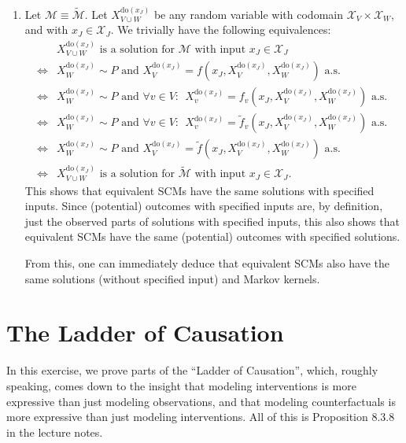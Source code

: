 \begin{gradedsolution}
\begin{enumerate}
    \item Let $\mathcal{M} \equiv \widetilde{\mathcal{M}}$.
      Let $X_{V\cup W}^{\text{do}(x_J)}$ be any random variable with codomain $\mathcal{X}_V \times \mathcal{X}_W$, and with $x_J \in \mathcal{X}_J$.
      We trivially have the following equivalences:
      \begin{align*}
      &	X_{V \cup W}^{\text{do}(x_J)} \text{ is a solution for } \mathcal{M} \text{ with input } x_J \in \mathcal{X}_J \\
      \Longleftrightarrow & X_W^{\text{do}(x_J)} \sim P \text{ and } X_V^{\text{do}(x_J)} = f(x_J, X_V^{\text{do}(x_J)}, X_W^{\text{do}(x_J)}) \text{ a.s. } \\
      \Longleftrightarrow & X_W^{\text{do}(x_J)} \sim P \text{ and } \forall v \in V: \ \ X_v^{\text{do}(x_J)} = f_v(x_J, X_V^{\text{do}(x_J)}, X_W^{\text{do}(x_J)}) \text{ a.s. } \\
      \Longleftrightarrow & X_W^{\text{do}(x_J)} \sim P \text{ and } \forall v \in V: \ \ X_v^{\text{do}(x_J)} = \widetilde{f}_v(x_J, X_V^{\text{do}(x_J)}, X_W^{\text{do}(x_J)}) \text{ a.s. } \\
      \Longleftrightarrow & X_W^{\text{do}(x_J)} \sim P \text{ and } X_V^{\text{do}(x_J)} = \widetilde{f}(x_J, X_V^{\text{do}(x_J)}, X_W^{\text{do}(x_J)}) \text{ a.s. } \\
      \Longleftrightarrow  &	X_{V \cup W}^{\text{do}(x_J)} \text{ is a solution for } \widetilde{\mathcal{M}} \text{ with input } x_J \in \mathcal{X}_J. 
      \end{align*}
      This shows that equivalent SCMs have the same solutions with specified inputs.
      Since (potential) outcomes with specified inputs are, by definition, just the observed parts of solutions with specified inputs, this also shows that equivalent SCMs have the same (potential) outcomes with specified solutions.
      
      From this, one can immediately deduce that equivalent SCMs also have the same solutions (without specified input) and Markov kernels.
    \end{enumerate}
  \end{gradedsolution}

  \section{The Ladder of Causation}

  In this exercise, we prove parts of the ``Ladder of Causation'', which, roughly speaking, comes down to the insight that modeling interventions is more expressive than just modeling observations, and that modeling counterfactuals is more expressive than just modeling interventions.
  All of this is Proposition 8.3.8 in the lecture notes.

